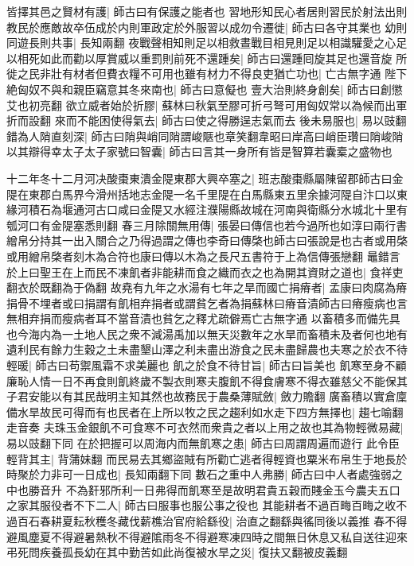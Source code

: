 皆擇其邑之賢材有護|{
	師古曰有保護之能者也}
習地形知民心者居則習民於射法出則教民於應敵故卒伍成於内則軍政定於外服習以成勿令遷徙|{
	師古曰各守其業也}
幼則同遊長則共事|{
	長知兩翻}
夜戰聲相知則足以相救晝戰目相見則足以相識驩愛之心足以相死如此而勸以厚賞威以重罰則前死不還踵矣|{
	師古曰還踵囘旋其足也還音旋}
所徙之民非壯有材者但費衣糧不可用也雖有材力不得良吏猶亡功也|{
	亡古無字通}
陛下絶匈奴不與和親臣竊意其冬來南也|{
	師古曰意儗也}
壹大治則終身創矣|{
	師古曰創懲艾也初亮翻}
欲立威者始於折膠|{
	蘇林曰秋氣至膠可折弓弩可用匈奴常以為候而出軍折而設翻}
來而不能困使得氣去|{
	師古曰使之得勝逞志氣而去}
後未易服也|{
	易以豉翻}
錯為人陗直刻深|{
	師古曰陗與峭同陗謂峻陿也章笑翻韋昭曰岸高曰峭臣瓚曰陗峻陗}
以其辯得幸太子太子家號曰智囊|{
	師古曰言其一身所有皆是智算若囊槖之盛物也}


十二年冬十二月河决酸棗東潰金隄東郡大興卒塞之|{
	班志酸棗縣屬陳留郡師古曰金隄在東郡白馬界今滑州括地志金隄一名千里隄在白馬縣東五里余據河隄自汴口以東緣河積石為堰通河古口咸曰金隄又水經注濮陽縣故城在河南與衛縣分水城北十里有瓠河口有金隄塞悉則翻}
春三月除關無用傳|{
	張晏曰傳信也若今過所也如淳曰兩行書繒帛分持其一出入關合之乃得過謂之傳也李奇曰傳棨也師古曰張說是也古者或用棨或用繒帛棨者刻木為合符也康曰傳以木為之長尺五書符于上為信傳張戀翻}
鼂錯言於上曰聖王在上而民不凍飢者非能耕而食之織而衣之也為開其資財之道也|{
	食祥吏翻衣於既翻為于偽翻}
故堯有九年之水湯有七年之旱而國亡捐瘠者|{
	孟康曰肉腐為瘠捐骨不埋者或曰捐謂有飢相弃捐者或謂貧乞者為捐蘇林曰瘠音漬師古曰瘠瘦病也言無相弃捐而瘦病者耳不當音漬也貧乞之釋尤疏僻焉亡古無字通}
以畜積多而備先具也今海内為一土地人民之衆不減湯禹加以無天災數年之水旱而畜積未及者何也地有遺利民有餘力生穀之土未盡墾山澤之利未盡出游食之民未盡歸農也夫寒之於衣不待輕暖|{
	師古曰苟禦風霜不求美麗也}
飢之於食不待甘旨|{
	師古曰旨美也}
飢寒至身不顧廉恥人情一日不再食則飢終歲不製衣則寒夫腹飢不得食膚寒不得衣雖慈父不能保其子君安能以有其民哉明主知其然也故務民于農桑薄賦斂|{
	斂力贍翻}
廣畜積以實倉廩備水旱故民可得而有也民者在上所以牧之民之趨利如水走下四方無擇也|{
	趨七喻翻走音奏}
夫珠玉金銀飢不可食寒不可衣然而衆貴之者以上用之故也其為物輕微易藏|{
	易以豉翻下同}
在於把握可以周海内而無飢寒之患|{
	師古曰周謂周遍而遊行}
此令臣輕背其主|{
	背蒲妹翻}
而民易去其鄉盜賊有所勸亡逃者得輕資也粟米布帛生于地長於時聚於力非可一日成也|{
	長知兩翻下同}
數石之重中人弗勝|{
	師古曰中人者處強弱之中也勝音升}
不為姧邪所利一日弗得而飢寒至是故明君貴五穀而賤金玉今農夫五口之家其服役者不下二人|{
	師古曰服事也服公事之役也}
其能耕者不過百畮百畮之收不過百石春耕夏耘秋穫冬藏伐薪樵治官府給繇役|{
	治直之翻繇與徭同後以義推}
春不得避風塵夏不得避暑熱秋不得避隂雨冬不得避寒凍四時之間無日休息又私自送往迎來弔死問疾養孤長幼在其中勤苦如此尚復被水旱之災|{
	復扶又翻被皮義翻}
